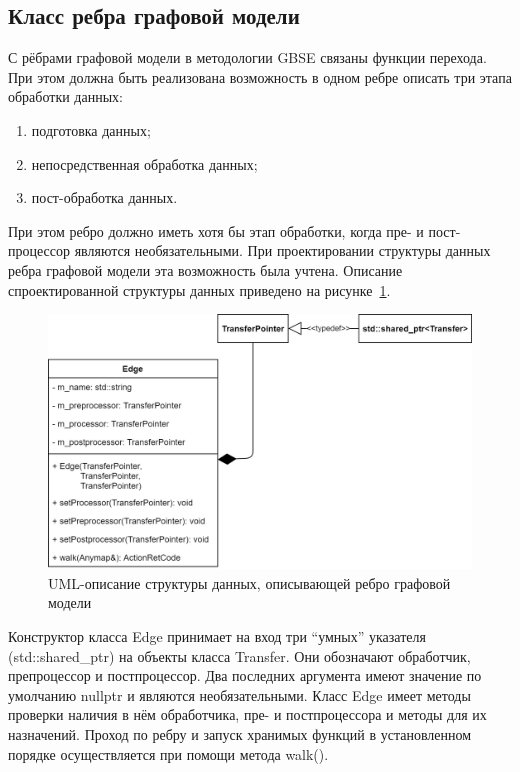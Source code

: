 \subsection{Класс ребра графовой модели}
С рёбрами графовой модели в методологии GBSE связаны функции перехода. При этом должна быть реализована возможность в одном ребре описать три этапа обработки данных:
\begin{enumerate}
    \item подготовка данных;
    \item непосредственная обработка данных;
    \item пост-обработка данных.
\end{enumerate}
При этом ребро должно иметь хотя бы этап обработки, когда пре- и пост- процессор являются необязательными. При проектировании структуры данных ребра графовой модели эта возможность была учтена. Описание спроектированной структуры данных приведено на рисунке~\ref{fig:UMLEdge}.
\begin{figure}[!ht]
    \centering
    \includegraphics[height=0.27\textheight]{figures/UML.edge.png}
    \caption{UML-описание структуры данных, описывающей ребро графовой модели}
    \label{fig:UMLEdge}
\end{figure}

Конструктор класса \textsf{Edge} принимает на вход три ``умных'' указателя (\textsf{std::shared_ptr}) на объекты класса \textsf{Transfer}. Они обозначают обработчик, препроцессор и постпроцессор. Два последних аргумента имеют значение по умолчанию \textsf{nullptr} и являются необязательными. Класс \textsf{Edge} имеет методы проверки наличия в нём обработчика, пре- и постпроцессора и методы для их назначений. Проход по ребру и запуск хранимых функций в установленном порядке осуществляется при помощи метода \textsf{walk()}.

